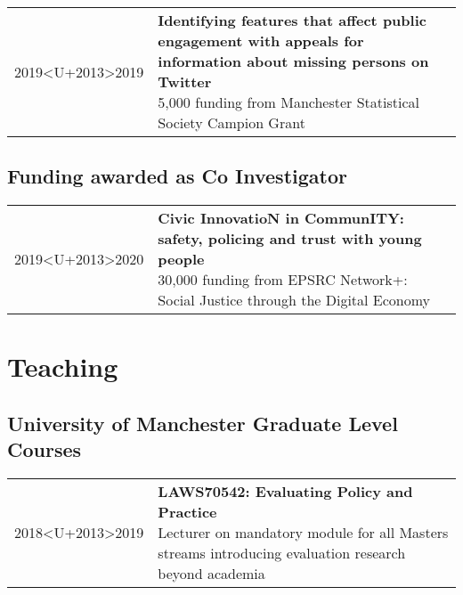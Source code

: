 \documentclass[10pt,a4paper,]{article}
\makeatletter
\def\briefitem#1#2#3{
#2 & \parbox[t]{0.85\textwidth}{%
      \textbf{#1}\\[-0.1cm]{\footnotesize #3}}\\[0.4cm]}
\def\briefsection#1{\begin{longtable}{@{\extracolsep{\fill}}ll}#1\end{longtable}}
\makeatother
\begin{document}
\briefsection{\briefitem{Identifying features that affect public engagement with appeals for information about missing persons on Twitter}{2019<U+2013>2019}{<U+00A3>5,000 funding from Manchester Statistical Society Campion Grant}\briefitem{Using Bayesian Surprise maps to explore debt and insolvency across the UK}{2018<U+2013>2019}{<U+00A3>10,000 funding from Consumer Data Research Centre, Economic and Social Research Council}\briefitem{Measuring fear of crime using app-based and sensing methodologies}{2017<U+2013>2020}{<U+00A3>10,000 funding from British Academy and Leverhulme Small Grants}\briefitem{Building Tools and Training for Crime Analysts using R}{2017<U+2013>2017}{<U+00A3>3,000 funding from N8 Policing Research Partnership}\briefitem{Data Visualisation in Criminal Courts}{2017<U+2013>2017}{<U+00A3>1,000 funding from Economic Social Research Council, Festival of Social Sciences}}

\hypertarget{funding-awarded-as-co-investigator}{%
\subsection{Funding awarded as Co Investigator}\label{funding-awarded-as-co-investigator}}

\briefsection{\briefitem{Civic InnovatioN in CommunITY: safety, policing and trust with young people}{2019<U+2013>2020}{<U+00A3>30,000 funding from EPSRC Network+: Social Justice through the Digital Economy}}

\hypertarget{teaching}{%
\section{Teaching}\label{teaching}}

\hypertarget{university-of-manchester-graduate-level-courses}{%
\subsection{University of Manchester Graduate Level Courses}\label{university-of-manchester-graduate-level-courses}}

\briefsection{\briefitem{LAWS70542: Evaluating Policy and Practice}{2018<U+2013>2019}{Lecturer on mandatory module for all Masters streams introducing evaluation research beyond academia}\briefitem{LAWS70311: Designing Criminological Research}{2016<U+2013>present}{Course director and primary lecturer on compulsory research methods module for all Masters streams}\briefitem{LAWS70821: Data Analysis with R \& R Studio}{2016<U+2013>2019}{2016: Course director and sole lecturer, 2018 onwards: ad-hoc lecturer on introductory statistics for MRes students using R}}
\end{document}
